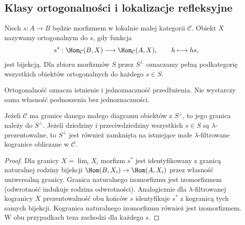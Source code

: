 \subsection{Klasy ortogonalności i lokalizacje refleksyjne}

\begin{definicja}\label{cat:def:accessible-orthogonal}
Niech $s:A\to B$ będzie morfizmem w lokalnie małej kategorii $\mathcal C$. Obiekt $X$ nazywamy ortogonalnym do $s$, gdy funkcja
\[
 s^*:\Hom_{\mathcal C}(B,X)\longrightarrow\Hom_{\mathcal C}(A,X),
 \qquad h\longmapsto hs,
\]
jest bijekcją. Dla zbioru morfizmów $S$ przez $S^\perp$ oznaczamy pełną podkategorię wszystkich obiektów ortogonalnych do każdego $s\in S$.
\end{definicja}

Ortogonalność oznacza istnienie i jednoznaczność przedłużenia. Nie wystarczy sama własność podnoszenia bez jednoznaczności.

\begin{center}
\end{center}

\begin{stwierdzenie}\label{cat:prop:accessible-orthogonal-closure}
Jeżeli $\mathcal C$ ma granice danego małego diagramu obiektów z $S^\perp$, to jego granica należy do $S^\perp$. Jeżeli dziedziny i przeciwdziedziny wszystkich $s\in S$ są $\lambda$-prezentowalne, to $S^\perp$ jest również zamknięta na istniejące małe $\lambda$-filtrowane kogranice obliczane w $\mathcal C$.
\end{stwierdzenie}
\begin{proof}
Dla granicy $X=\lim_iX_i$ morfizm $s^*$ jest identyfikowany z granicą naturalnej rodziny bijekcji $\Hom(B,X_i)\to\Hom(A,X_i)$ przez własność uniwersalną granicy. Granica naturalnego izomorfizmu jest izomorfizmem (odwrotność indukuje rodzina odwrotności). Analogicznie dla $\lambda$-filtrowanej kogranicy $X$ prezentowalność obu końców $s$ identyfikuje $s^*$ z kogranicą tych samych bijekcji. Kogranica naturalnego izomorfizmu również jest izomorfizmem. W obu przypadkach teza zachodzi dla każdego $s$.
\end{proof}

